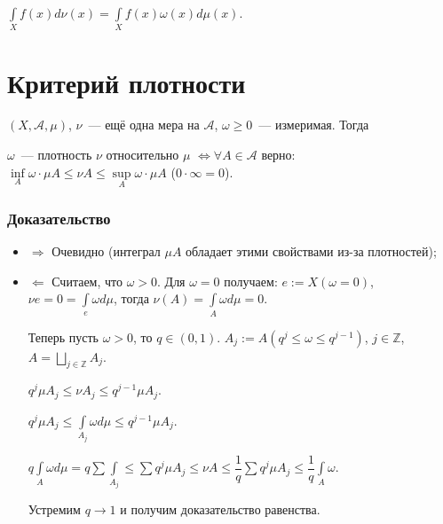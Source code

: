 \documentclass{article}
\begin{document}
            $\int\limits_X f(x) d \nu(x) = \int\limits_X f(x) \omega(x) d \mu(x)$.
    
    \newpage
            
    \section{Критерий плотности}
    
        $(X, \mathcal{A}, \mu)$, $\nu$~--- ещё одна мера на $\mathcal{A}$, $\omega \geqslant 0$~--- измеримая. Тогда
        
        $\omega$~--- плотность $\nu$ относительно $\mu$ $\Longleftrightarrow \forall A \in \mathcal{A}$ верно: $\inf\limits_{A} \omega \cdot \mu A \leqslant \nu A \leqslant \sup\limits_{A} \omega \cdot \mu A$ ($0 \cdot \infty = 0$).
        
        \subsubsection{Доказательство}
        
            \begin{itemize}
            
                \item $\Rightarrow$ Очевидно (интеграл $\mu A$ обладает этими свойствами из-за плотностей);
                
                \item $\Leftarrow$ Считаем, что $\omega > 0$. Для $\omega = 0$ получаем: $e := X(\omega = 0)$, $\nu e = 0 = \int\limits_e \omega d \mu$, тогда $\nu (A) = \int\limits_{A} \omega d \mu = 0$. 
                
                Теперь пусть $\omega > 0$, то $q \in (0, 1)$. $A_j := A(q^j \leqslant \omega \leqslant q^{j - 1})$, $j \in \mathbb{Z}$, $A = \bigsqcup\limits_{j \in \mathbb{Z}} A_j$.
                
                    $q^j \mu A_j \leqslant \nu A_j \leqslant q^{j - 1} \mu A_j$.
                    
                    $q^j \mu A_j \leqslant \int\limits_{A_j} \omega d \mu \leqslant q^{j - 1} \mu A_j$.
                    
                    $q \int\limits_A \omega d \mu = q \sum \int\limits_{A_j} \leqslant \sum q^j \mu A_j \leqslant \nu A \leqslant \dfrac{1}{q} \sum q^j \mu A_j \leqslant \dfrac{1}{q} \int\limits_A \omega$.
                    
                    Устремим $q \rightarrow 1$ и получим доказательство равенства.
                    
            \end{itemize}
           
\end{document}
